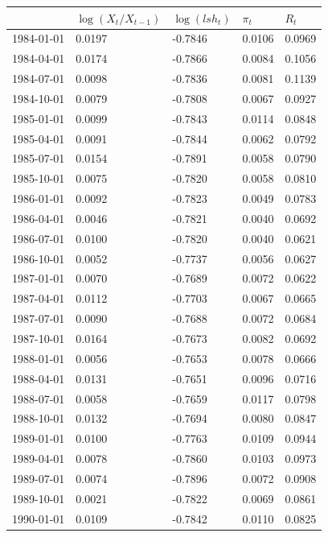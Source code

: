 \begin{longtable}{p{}|p{}p{}p{}p{}}
        \hline
        &$\log\left( X_{t}/X_{t-1} \right)$	&$\log (lsh_{t})$	& $ \pi_{t}$	& $R_{t}$\\
        \hline
        1984-01-01	&0.0197	&-0.7846	&0.0106	&0.0969\\
        1984-04-01	&0.0174	&-0.7866	&0.0084	&0.1056\\
        1984-07-01	&0.0098	&-0.7836	&0.0081	&0.1139\\
        1984-10-01	&0.0079	&-0.7808	&0.0067	&0.0927\\
        1985-01-01	&0.0099	&-0.7843	&0.0114	&0.0848\\
        1985-04-01	&0.0091	&-0.7844	&0.0062	&0.0792\\
        1985-07-01	&0.0154	&-0.7891	&0.0058	&0.0790\\
        1985-10-01	&0.0075	&-0.7820	&0.0058	&0.0810\\
        1986-01-01	&0.0092	&-0.7823	&0.0049	&0.0783\\
        1986-04-01	&0.0046	&-0.7821	&0.0040	&0.0692\\
        1986-07-01	&0.0100	&-0.7820	&0.0040	&0.0621\\
        1986-10-01	&0.0052	&-0.7737	&0.0056	&0.0627\\
        1987-01-01	&0.0070	&-0.7689	&0.0072	&0.0622\\
        1987-04-01	&0.0112	&-0.7703	&0.0067	&0.0665\\
        1987-07-01	&0.0090	&-0.7688	&0.0072	&0.0684\\
        1987-10-01	&0.0164	&-0.7673	&0.0082	&0.0692\\
        1988-01-01	&0.0056	&-0.7653	&0.0078	&0.0666\\
        1988-04-01	&0.0131	&-0.7651	&0.0096	&0.0716\\
        1988-07-01	&0.0058	&-0.7659	&0.0117	&0.0798\\
        1988-10-01	&0.0132	&-0.7694	&0.0080	&0.0847\\
        1989-01-01	&0.0100	&-0.7763	&0.0109	&0.0944\\
        1989-04-01	&0.0078	&-0.7860	&0.0103	&0.0973\\
        1989-07-01	&0.0074	&-0.7896	&0.0072	&0.0908\\
        1989-10-01	&0.0021	&-0.7822	&0.0069	&0.0861\\
        1990-01-01	&0.0109	&-0.7842	&0.0110	&0.0825\\

\end{longtable}
